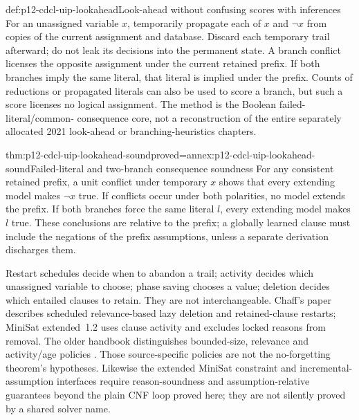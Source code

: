 \begin{hbmethod}{def:p12-cdcl-uip-lookahead}{Look-ahead without confusing scores with inferences}
For an unassigned variable \(x\), temporarily propagate each of \(x\)
and \(\neg x\) from copies of the current assignment and database.
Discard each temporary trail afterward; do not leak its decisions into the
permanent state.  A branch conflict licenses the opposite assignment under
the current retained prefix.  If both branches imply the same literal, that
literal is implied under the prefix.  Counts of reductions or propagated
literals can also be used to score a branch, but such a score licenses no
logical assignment.  The method is the Boolean failed-literal/common-
consequence core, not a reconstruction of the entire separately allocated
2021 look-ahead or branching-heuristics chapters.
\end{hbmethod}

\begin{hblemma}{thm:p12-cdcl-uip-lookahead-sound}{proved=annex:p12-cdcl-uip-lookahead-sound}{Failed-literal and two-branch consequence soundness}
For any consistent retained prefix, a unit conflict under temporary \(x\)
shows that every extending model makes \(\neg x\) true.  If conflicts
occur under both polarities, no model extends the prefix.  If both branches
force the same literal \(l\), every extending model makes \(l\) true.
These conclusions are relative to the prefix; a globally learned clause must
include the negations of the prefix assumptions, unless a separate derivation
discharges them.
\end{hblemma}

Restart schedules decide when to abandon a trail; activity decides which
unassigned variable to choose; phase saving chooses a value; deletion decides
which entailed clauses to retain.  They are not interchangeable.  Chaff's
paper describes scheduled relevance-based lazy deletion and retained-clause
restarts; MiniSat extended~1.2 uses clause activity and excludes locked reasons
from removal.  The older handbook distinguishes bounded-size, relevance and
activity/age policies \cite[Secs.~4.1--4.2]{MoskewiczEtAl2001ChaffV56}
\cite[Secs.~4.5.2--4.5.4]{MarquesSilvaLynceMalik2008CDCLManuscript}
\cite[Secs.~4.5, 4.7--4.8]{EenSorenssonMiniSatExtended12}.
Those source-specific policies are not the no-forgetting theorem's hypotheses.
Likewise the extended MiniSat constraint and incremental-assumption interfaces
require reason-soundness and assumption-relative guarantees beyond the plain
CNF loop proved here; they are not silently proved by a shared solver name.
